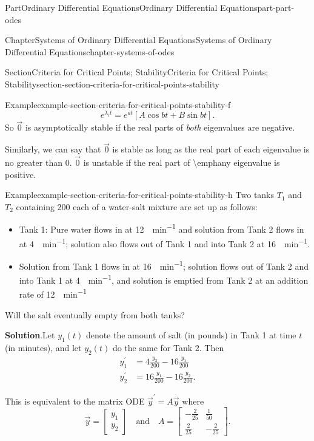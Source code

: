 \documentclass[twoside,10pt,]{book}
\newcommand{\blocktitlefont}{\relax}
\numberwithin{equation}{part}
\begin{document}
\begin{partptx}{Part}{Ordinary Differential Equations}{}{Ordinary Differential Equations}{}{}{part-part-odes}
\begin{chapterptx}{Chapter}{Systems of Ordinary Differential Equations}{}{Systems of Ordinary Differential Equations}{}{}{chapter-systems-of-odes}
\begin{sectionptx}{Section}{Criteria for Critical Points; Stability}{}{Criteria for Critical Points; Stability}{}{}{section-section-criteria-for-critical-points-stability}
\begin{example}{Example}{}{example-section-criteria-for-critical-points-stability-f}
\begin{equation*}
e^{\lambda_{i}t} = e^{at}[A\cos bt+B\sin bt]\text{.}
\end{equation*}
So \(\vec{0}\) is asymptotically stable if the real parts of \emph{both} eigenvalues are negative.%
\end{example}
Similarly, we can say that \(\vec{0}\) is stable as long as the real part of each eigenvalue is no greater than \(0\). \(\vec{0}\) is unstable if the real part of \textbackslash{}emph\textbraceleft{}any\textbraceright{} eigenvalue is positive.%
\begin{example}{Example}{}{example-section-criteria-for-critical-points-stability-h}%
Two tanks \(T_{1}\) and \(T_{2}\) containing \SI{200}{\gallon} each of a water-salt mixture are set up as follows:%
%
\begin{itemize}[label=\textbullet]
\item{}Tank 1: Pure water flows in at \SI{12}{\gallon\per\minute} and solution from Tank 2 flows in at \SI{4}{\gallon\per\minute}; solution also flows out of Tank 1 and into Tank 2 at \SI{16}{\gallon\per\minute}.%
\item{}Solution from Tank 1 flows in at \SI{16}{\gallon\per\minute}; solution flows out of Tank 2 and into Tank 1 at \SI{4}{\gallon\per\minute}, and solution is emptied from Tank 2 at an addition rate of \SI{12}{\gallon\per\minute}%
\end{itemize}
Will the salt eventually empty from both tanks?%
\par\smallskip%
\noindent\textbf{\blocktitlefont Solution}.\hypertarget{solution-section-criteria-for-critical-points-stability-h-b}{}\quad{}Let \(y_{1}(t)\) denote the amount of salt (in pounds) in Tank 1 at time \(t\) (in minutes), and let \(y_{2}(t)\) do the same for Tank 2. Then%
\begin{align*}
y^\prime_{1}  & =  4\frac{y_{2}}{200} - 16\frac{y_{1}}{200}\\
y^\prime_{2}  & =  16\frac{y_{1}}{200} - 16\frac{y_{2}}{200}\text{.}
\end{align*}
%
\par
This is equivalent to the matrix ODE \(\vec{y}^\prime = A\vec{y}\) where%
\begin{equation*}
\vec{y} = \begin{bmatrix}y_{1}\\y_{2}\end{bmatrix}\quad\text{and}\quad A = \begin{bmatrix}-\frac{2}{25} &  \frac{1}{50} \\ \frac{2}{25} &  -\frac{2}{25}\end{bmatrix}.

\end{equation*}
\end{example}
\end{sectionptx}
\end{chapterptx}
\end{partptx}
\end{document}
